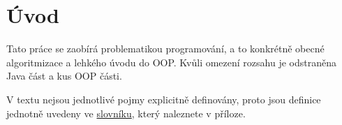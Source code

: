 \chapter{Úvod}
Tato práce se zaobírá problematikou programování, a to konkrétně obecné algoritmizace a lehkého úvodu do OOP. Kvůli omezení rozsahu je odstraněna Java část a kus OOP části.

V textu nejsou jednotlivé pojmy explicitně definovány, proto jsou definice jednotně uvedeny ve \hyperref[app:slovnik]{slovníku}, který naleznete v příloze.